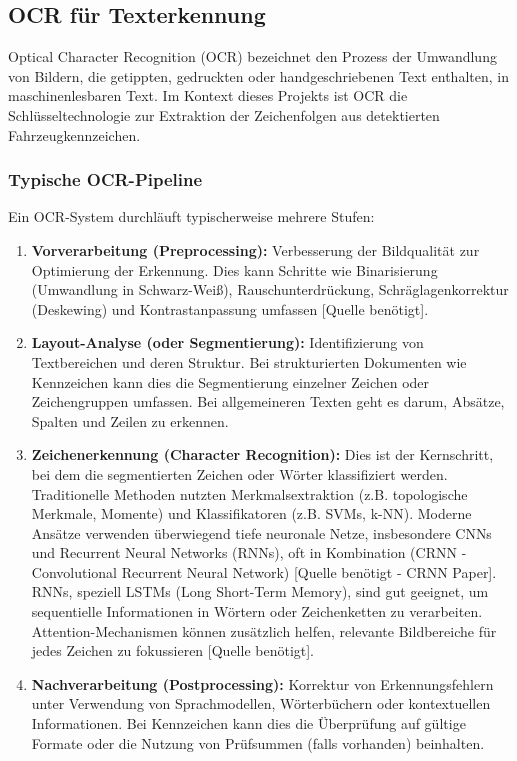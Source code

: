 \subsection{OCR für Texterkennung}

Optical Character Recognition (OCR) bezeichnet den Prozess der Umwandlung von Bildern, die getippten, gedruckten oder handgeschriebenen Text enthalten, in maschinenlesbaren Text. Im Kontext dieses Projekts ist OCR die Schlüsseltechnologie zur Extraktion der Zeichenfolgen aus detektierten Fahrzeugkennzeichen.

\subsubsection{Typische OCR-Pipeline}
Ein OCR-System durchläuft typischerweise mehrere Stufen:

\begin{enumerate}
    \item \textbf{Vorverarbeitung (Preprocessing):} Verbesserung der Bildqualität zur Optimierung der Erkennung. Dies kann Schritte wie Binarisierung (Umwandlung in Schwarz-Weiß), Rauschunterdrückung, Schräglagenkorrektur (Deskewing) und Kontrastanpassung umfassen [Quelle benötigt].

    \item \textbf{Layout-Analyse (oder Segmentierung):} Identifizierung von Textbereichen und deren Struktur. Bei strukturierten Dokumenten wie Kennzeichen kann dies die Segmentierung einzelner Zeichen oder Zeichengruppen umfassen. Bei allgemeineren Texten geht es darum, Absätze, Spalten und Zeilen zu erkennen.

    \item \textbf{Zeichenerkennung (Character Recognition):} Dies ist der Kernschritt, bei dem die segmentierten Zeichen oder Wörter klassifiziert werden. Traditionelle Methoden nutzten Merkmalsextraktion (z.B. topologische Merkmale, Momente) und Klassifikatoren (z.B. SVMs, k-NN). Moderne Ansätze verwenden überwiegend tiefe neuronale Netze, insbesondere CNNs und Recurrent Neural Networks (RNNs), oft in Kombination (CRNN - Convolutional Recurrent Neural Network) [Quelle benötigt - CRNN Paper]. RNNs, speziell LSTMs (Long Short-Term Memory), sind gut geeignet, um sequentielle Informationen in Wörtern oder Zeichenketten zu verarbeiten. Attention-Mechanismen können zusätzlich helfen, relevante Bildbereiche für jedes Zeichen zu fokussieren [Quelle benötigt].

    \item \textbf{Nachverarbeitung (Postprocessing):} Korrektur von Erkennungsfehlern unter Verwendung von Sprachmodellen, Wörterbüchern oder kontextuellen Informationen. Bei Kennzeichen kann dies die Überprüfung auf gültige Formate oder die Nutzung von Prüfsummen (falls vorhanden) beinhalten.
\end{enumerate}

